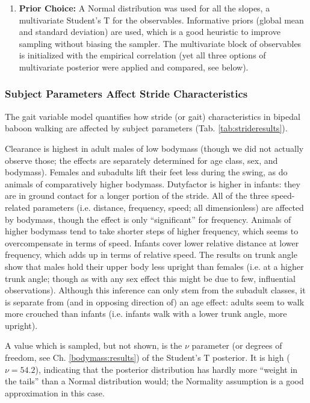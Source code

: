 \begin{enumerate}
\item \textbf{Prior Choice:}
\label{sec:orgffbfe48}
A Normal distribution was used for all the slopes, a multivariate Student's T for the observables.
Informative priors (global mean and standard deviation) are used, which is a good heuristic to improve sampling without biasing the sampler.
The multivariate block of observables is initialized with the empirical correlation (yet all three options of multivariate posterior were applied and compared, see below).
\end{enumerate}


\subsubsection{Subject Parameters Affect Stride Characteristics}
\label{sec:orge85b957}
The gait variable model quantifies how stride (or gait) characteristics in bipedal baboon walking are affected by subject parameters (Tab. \ref{tab:strideresults}).

Clearance is highest in adult males of low bodymass (though we did not actually observe those; the effects are separately determined for age class, sex, and bodymass).
Females and subadults lift their feet less during the swing, as do animals of comparatively higher bodymass.
Dutyfactor is higher in infants: they are in ground contact for a longer portion of the stride.
All of the three speed-related parameters (i.e. distance, frequency, speed; all dimensionless) are affected by bodymass, though the effect is only ``significant'' for frequency.
Animals of higher bodymass tend to take shorter steps of higher frequency, which seems to overcompensate in terms of speed.
Infants cover lower relative distance at lower frequency, which adds up in terms of relative speed.
The results on trunk angle show that males hold their upper body less upright than females (i.e. at a higher trunk angle; though as with any sex effect this might be due to few, influential observations).
Although this inference can only stem from the subadult classes, it is separate from (and in opposing direction of) an age effect: adults seem to walk more crouched than infants (i.e. infants walk with a lower trunk angle, more upright).

A value which is sampled, but not shown, is the \(\nu\) parameter (or degrees of freedom, see Ch. \ref{bodymass:results}) of the Student's T posterior.
It is high (\(\nu = 54.2\)), indicating that the posterior distribution has hardly more ``weight in the tails'' than a Normal distribution would; the Normality assumption is a good approximation in this case.


